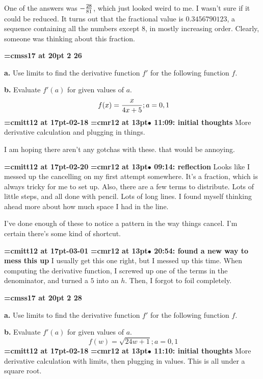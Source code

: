 One of the answers was $-{28 \over 81}$, which just looked weird to me. I wasn't sure if it could be reduced. It turns out that the fractional value is $0.3456790123$, a sequence containing all the numbers except 8, in mostly increasing order. Clearly, someone was thinking about this fraction.
\par

{\medskip\noindent\bf\font\titlefont=cmss17 at 20pt 2 26}\medskip
\par {\bf a.} Use limits to find the derivative function $f'$ for
the following function $f$.
\par {\bf b.} Evaluate $f'(a)$ for given values of $a$.
$$\
f(x) = {x \over 4x + 5}; a = 0, 1
$$
{\medskip\noindent\bf\font\titlefont=cmitt12 at 17pt-02-18}\medskip
{\smallskip\noindent\bf\font\titlefont=cmr12 at 13pt\titlefont $\bullet$ 11:09: initial thoughts}\smallskip
More derivative calculation and plugging in things.
\par

I am hoping there aren't any gotchas with these. that would be annoying.
\par

{\medskip\noindent\bf\font\titlefont=cmitt12 at 17pt-02-20}\medskip
{\smallskip\noindent\bf\font\titlefont=cmr12 at 13pt\titlefont $\bullet$ 09:14: reflection}\smallskip
Looks like I messed up the cancelling on my first attempt somewhere. It's a fraction, which is always tricky for me to set up. Also, there are a few terms to distribute. Lots of little steps, and all done with pencil. Lots of long lines. I found myself thinking ahead more about how much space I had in the line.
\par

I've done enough of these to notice a pattern in the way things cancel. I'm certain there's some kind of shortcut.
\par

{\medskip\noindent\bf\font\titlefont=cmitt12 at 17pt-03-01}\medskip
{\smallskip\noindent\bf\font\titlefont=cmr12 at 13pt\titlefont $\bullet$ 20:54: found a new way to mess this up}\smallskip
I usually get this one right, but I messed up this time. When computing the derivative function, I screwed up one of the terms in the denominator, and turned a $5$ into an $h$. Then, I forgot to foil completely.
\par

{\medskip\noindent\bf\font\titlefont=cmss17 at 20pt 2 28}\medskip
\par {\bf a.} Use limits to find the derivative function $f'$ for
the following function $f$.
\par {\bf b.} Evaluate $f'(a)$ for given values of $a$.
$$\
f(w) = \sqrt{24w + 1}; a = 0, 1
$$
{\medskip\noindent\bf\font\titlefont=cmitt12 at 17pt-02-18}\medskip
{\smallskip\noindent\bf\font\titlefont=cmr12 at 13pt\titlefont $\bullet$ 11:10: initial thoughts}\smallskip
More derivative calculation with limits, then plugging in values. This is all under a square root.
\par

